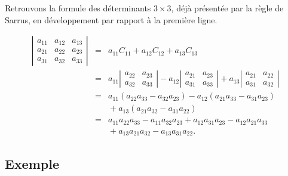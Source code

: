 \documentclass[class=report,crop=false]{standalone}
\begin{document}
\begin{exemple}
Retrouvons la formule des déterminants $3\times 3$, déjà présentée
par la règle de Sarrus, en développement par rapport à la première ligne.

$$\begin{array}{rcl}
\left|\begin{matrix}
a_{11}&a_{12}&a_{13}\\
a_{21}&a_{22}&a_{23}\\
a_{31}&a_{32}&a_{33}
\end{matrix}\right|&=&a_{11}C_{11}+a_{12}C_{12}+a_{13}C_{13}\\
&=&a_{11}\left|\begin{matrix}
a_{22}&a_{23}\\
a_{32}&a_{33}
\end{matrix}\right|-a_{12}\left|\begin{matrix}
a_{21}&a_{23}\\
a_{31}&a_{33}
\end{matrix}\right|+a_{13}\left|\begin{matrix}
a_{21}&a_{22}\\
a_{31}&a_{32}
\end{matrix}\right|\\
&=&a_{11}(a_{22}a_{33}-a_{32}a_{23})-a_{12}(a_{21}a_{33}-a_{31}a_{23})\\
&&{}+a_{13}(a_{21}a_{32}-a_{31}a_{22})\\
&=&a_{11}a_{22}a_{33}-a_{11}a_{32}a_{23}+a_{12}a_{31}a_{23}-a_{12}a_{21}a_{33}\\
&&{}+a_{13}a_{21}a_{32}-a_{13}a_{31}a_{22}.
\end{array}$$
\end{exemple}


\subsection{Exemple}
\end{document}
